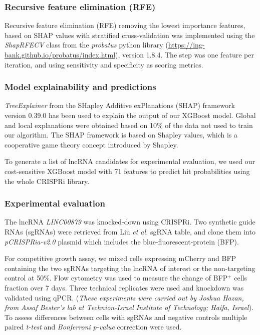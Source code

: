 \subsubsection{Recursive feature elimination (RFE)}
\label{sec:rfe_methods}

Recursive feature elimination (RFE) removing the lowest importance features, based on SHAP values\autocite{lundberg_2020, lundberg_2018} with stratified cross-validation was implemented using the \textit{ShapRFECV} class from the \textit{probatus} python library (\url{https://ing-bank.github.io/probatus/index.html}), version 1.8.4.  The step was one feature per iteration, and using sensitivity and specificity as scoring metrics. 

\subsubsection{Model explainability and predictions}
\label{sec:model_explanation_methods}

\textit{TreeExplainer} from the SHapley Additive exPlanations\autocite{lundberg_2020, lundberg_2018} (SHAP) framework version 0.39.0 has been used to explain the output of our XGBoost model. Global and local explanations were obtained based on 10\% of the data not used to train our algorithm. The SHAP framework is based on Shapley values\autocite{shapley_SHAP_values}, which is a cooperative game theory concept introduced by Shapley. 

To generate a list of lncRNA candidates for experimental evaluation, we used our cost-sensitive XGBoost model with 71 features to predict hit probabilities using the whole CRISPRi library. 

\subsubsection{Experimental evaluation}
\label{sec:prediction_exp_eva_methods}

The lncRNA \textit{LINC00879} was knocked-down using CRISPRi. Two synthetic guide RNAs (sgRNAs) were retrieved from Liu \textit{et al.}\autocite{liu_2017_crispri} sgRNA table, and clone them into \textit{pCRISPRia-v2.0} plasmid which includes the blue-fluorescent-protein (BFP). 

For competitive growth assay, we mixed cells expressing mCherry and BFP containing the two sgRNAs targeting the lncRNA of interest or the non-targeting control at 50\%. Flow cytometry was used to measure the change of BFP$^+$ cells fraction over 7 days.  Three technical replicates were used and knockdown was validated using qPCR. (\textit{These experiments were carried out by Joshua Hazan, from Assaf Bester's lab at Technion-Israel Institute of Technology; Haifa, Israel}). To assess differences between cells with sgRNAs and negative controls multiple paired \textit{t-test} and \textit{Bonferroni} \textit{p-value} correction were used. 

